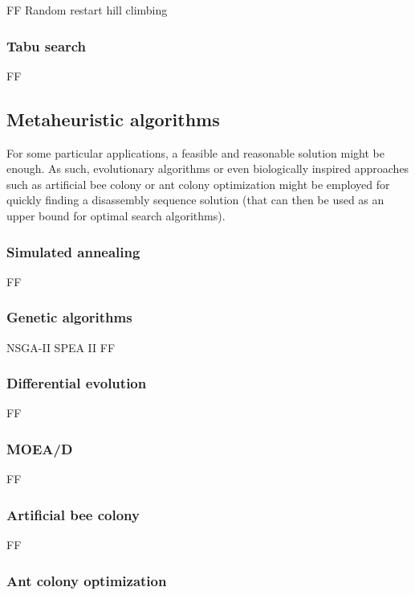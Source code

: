 FF
Random restart hill climbing



\subsubsection{Tabu search}

FF



\subsection{Metaheuristic algorithms}

For some particular applications, a feasible and reasonable solution might be enough. As such, evolutionary algorithms \cite{Elsayed2012} or even biologically inspired approaches such as artificial bee colony \cite{Yuan2016} or ant colony optimization \cite{Liu2012} might be employed for quickly finding a disassembly sequence solution (that can then be used as an upper bound for optimal search algorithms).


\subsubsection{Simulated annealing}

FF


\subsubsection{Genetic algorithms}

NSGA-II
SPEA II
FF


\subsubsection{Differential evolution}

FF


\subsubsection{MOEA/D}

FF


\subsubsection{Artificial bee colony}

FF


\subsubsection{Ant colony optimization}

